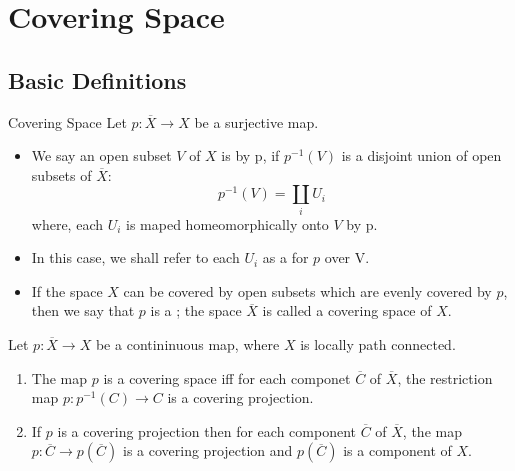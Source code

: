 \documentclass[../main.tex]{subfiles}
\begin{document}
\chapter{ Covering Space }

\section{Basic Definitions}
\begin{definition}{Covering Space}{}
    Let \(  p:\overline{X}\to X  \) be a surjective map. 
    \begin{itemize}
        \item We say an open subset  \(  V  \) of \(  X  \) is  by p, if \(  p ^{-1} \left( V \right)   \) is a disjoint union of open subsets of \(  \overline{X}  \):  \[
    p ^{-1} \left( V \right)= \coprod _{i}U_{i} 
    \] where, each \(  U_{i}  \) is maped homeomorphically onto \(  V  \) by p.
    \item In this case, we shall refer to each \(  U_{i}  \) as a   for \(  p  \) over V. 
      \item If the space \(  X  \) can be covered by open subsets which are evenly covered by \(  p  \), then we say that \(  p  \) is a ; the space \(  \overline{X}  \) is called a covering space of \(  X  \). 
    \end{itemize}
    
    
\end{definition}

\begin{theorem}{}{}
    Let \(  p: \overline{X}  \to X\) be a contininuous map, where \(  X  \) is locally path connected.  \begin{enumerate}
        \item The map \(  p  \) is a covering space iff for each componet \(  \overline{C}  \) of \(  \overline{X}  \), the restriction map \(  p: p ^{-1} \left( C \right) \to C   \) is a covering projection.    
        \item If \(  p  \) is a covering projection then for each component \(  \overline{C}  \) of \(  \overline{X}  \), the map \(  p: \overline{C} \to p\left(  \overline{C}\right)   \) is a covering projection and \(  p\left( \overline{C} \right)   \) is a component of \(  X  \).     
    \end{enumerate}
    
\end{theorem}
\end{document}
